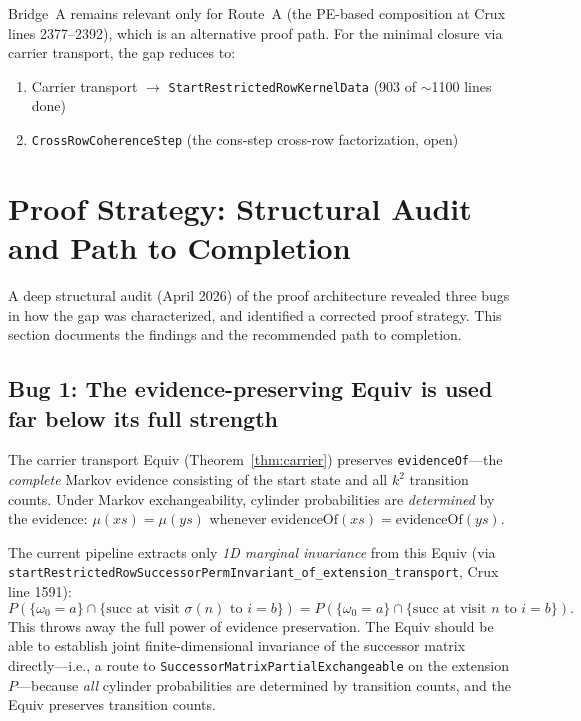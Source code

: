 \documentclass[11pt]{article}
\theoremstyle{definition}
\newcommand{\lean}[1]{\texttt{#1}}
\begin{document}
Bridge~A remains relevant only for Route~A (the PE-based composition
at Crux lines 2377--2392), which is an alternative proof path.  For
the minimal closure via carrier transport, the gap reduces to:
\begin{enumerate}[leftmargin=2em]
\item Carrier transport $\to$ \lean{StartRestrictedRowKernelData}
  (903 of $\sim$1100 lines done)
\item \lean{CrossRowCoherenceStep} (the cons-step cross-row factorization,
  open)
\end{enumerate}

\section{Proof Strategy: Structural Audit and Path to Completion}
\label{sec:strategy}

A deep structural audit (April 2026) of the proof architecture revealed
three bugs in how the gap was characterized, and identified a corrected
proof strategy.  This section documents the findings and the recommended
path to completion.

\subsection{Bug 1: The evidence-preserving Equiv is used far below its full strength}
\label{sec:bug1}

The carrier transport Equiv (Theorem~\ref{thm:carrier}) preserves
\lean{evidenceOf}---the \emph{complete} Markov evidence consisting of
the start state and all $k^2$ transition counts.  Under Markov
exchangeability, cylinder probabilities are \emph{determined} by the
evidence: $\mu(xs) = \mu(ys)$ whenever $\mathrm{evidenceOf}(xs) =
\mathrm{evidenceOf}(ys)$.

The current pipeline extracts only \emph{1D marginal invariance}
from this Equiv (via \lean{startRestrictedRowSuccessorPermInvariant\-\_of\_extension\_transport}, Crux line 1591):
\[
P(\{\omega_0 = a\} \cap \{\text{succ at visit } \sigma(n) \text{ to } i = b\})
= P(\{\omega_0 = a\} \cap \{\text{succ at visit } n \text{ to } i = b\}).
\]
This throws away the full power of evidence preservation.  The Equiv
should be able to establish joint finite-dimensional invariance of the
successor matrix directly---i.e., a route to
\lean{SuccessorMatrixPartialExchangeable} on the extension $P$---because
\emph{all} cylinder probabilities are determined by transition counts, and
the Equiv preserves transition counts.
\end{document}
